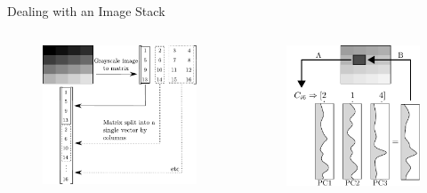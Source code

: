 \documentclass[pdf]{beamer}
\begin{document}
 \begin{frame}{Dealing with an Image Stack}
   \begin{columns}
	 \begin{figure}[ht!]
	   \centering
	   \includegraphics[width=\textwidth]{Images/pca_frame_decomposition.pdf}
	 \end{figure}
	 \begin{figure}[ht!]
	   \centering
	   \includegraphics[width=\textwidth]{Images/pca_linearcombo.pdf}
	 \end{figure}
   \end{columns}
 \end{frame}
\end{document}
